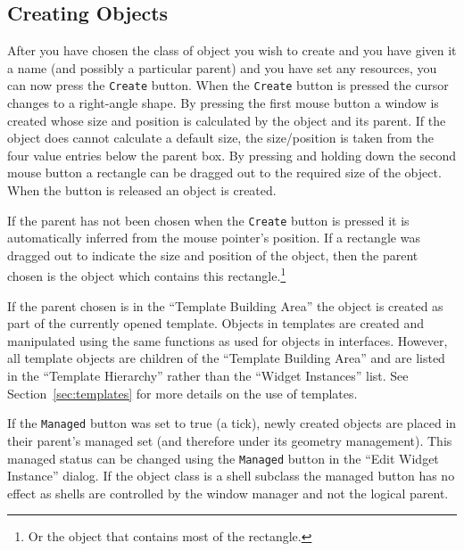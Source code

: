 \subsection{Creating Objects}
\label{sec:managed-parents}
After you have chosen the class of object you
wish to create and you have given it a name (and possibly a particular
parent) and you have set any resources, you can now press the {\tt Create}
button.  When the {\tt Create} button is pressed the cursor changes to a
right-angle shape.  By pressing the first mouse button a window is created
whose size and position is calculated by the object and its parent.
If the object does cannot calculate a default size, the size/position is
taken from the four value entries below
the parent box.  By pressing and holding down the second mouse button a
rectangle can be dragged out to the required size of the object.
When the button is released an object is created.

If the parent has not been chosen when the {\tt Create} button is pressed it is
automatically inferred from the mouse pointer's position. If a
rectangle was dragged out to indicate the size and position of the 
object, then the parent chosen is the object which contains this 
rectangle.\footnote{Or the object that contains most of the rectangle.}

If the parent chosen is in the ``Template Building Area'' the object
is created as part of the currently opened template.  Objects in templates
are created and manipulated using the same functions as used for objects in
interfaces.  However, all template objects are children of the ``Template
Building Area'' and are listed in the ``Template Hierarchy'' rather than
the ``Widget Instances'' list.  See Section~\ref{sec:templates} for more
details on the use of templates.

If the {\tt Managed} button was set to true (a tick),
newly created objects are placed in their parent's managed set (and therefore
under its geometry management).
This managed status can be changed using the {\tt Managed} button in
the ``Edit Widget Instance'' dialog.
If the object class is a shell subclass the managed button has no effect as
shells are controlled by the window manager and not the logical parent.

